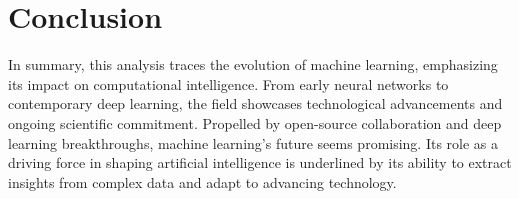 \documentclass{article}
\begin{document}
\section{Conclusion}
In summary, this analysis traces the evolution of machine learning, emphasizing its impact on computational intelligence. From early neural networks to contemporary deep learning, the field showcases technological advancements and ongoing scientific commitment. Propelled by open-source collaboration and deep learning breakthroughs, machine learning's future seems promising. Its role as a driving force in shaping artificial intelligence is underlined by its ability to extract insights from complex data and adapt to advancing technology.

\end{document}
